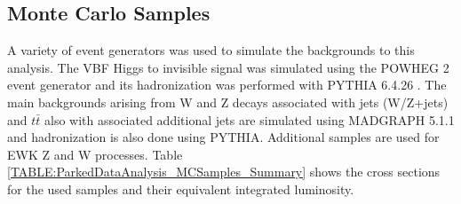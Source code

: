 \subsection{Monte Carlo Samples}


A variety of event generators was used to simulate the backgrounds to this analysis. The \gls{VBF} Higgs to invisible signal was simulated using the \textsc{POWHEG} 2 event generator \cite{ARTICLE:POWHEG_2004,ARTICLE:POWHEG_2007,ARTICLE:POWHEG_2009v1,ARTICLE:POWHEG_2009v2,ARTICLE:POWHEG_2010v1,ARTICLE:POWHEG_2010v2,ARTICLE:POWHEG_2011v1,ARTICLE:POWHEG_2011v2} and its hadronization was performed with \textsc{PYTHIA} 6.4.26 \cite{ARTICLE:Pythia6p4PhysicsAndManual}. The main backgrounds arising from W and Z decays associated with jets (W/Z+jets) and $t\bar{t}$ also with associated additional jets are simulated using \textsc{MADGRAPH} 5.1.1 \cite{ARTICLE:MadGraph5,ARTICLE:aMCatNLO} and hadronization is also done using \textsc{PYTHIA}. Additional samples are used for \gls{EWK} Z and W processes. Table \ref{TABLE:ParkedDataAnalysis_MCSamples_Summary} shows the cross sections for the used samples and their equivalent integrated luminosity.

